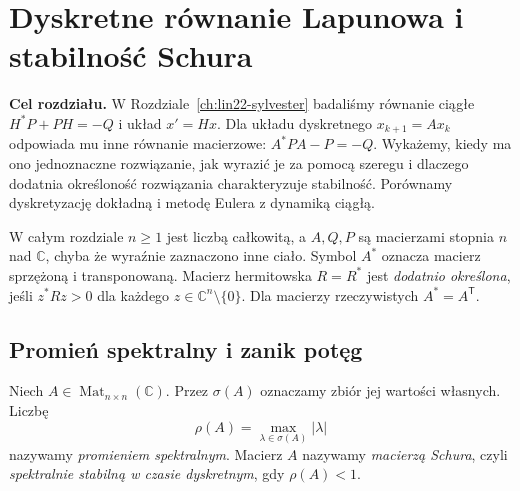 \chapter{Dyskretne równanie Lapunowa i stabilność Schura}
\label{ch:lin23-discrete-lyapunov}

\noindent\textbf{Cel rozdziału.}
W Rozdziale~\ref{ch:lin22-sylvester}
badaliśmy równanie ciągłe
\(H^*P+PH=-Q\) i układ \(x'=Hx\).
Dla układu dyskretnego
\(x_{k+1}=Ax_k\) odpowiada mu
inne równanie macierzowe:
\(A^*PA-P=-Q\).
Wykażemy, kiedy ma ono
jednoznaczne rozwiązanie,
jak wyrazić je za pomocą szeregu
i dlaczego dodatnia określoność
rozwiązania charakteryzuje stabilność.
Porównamy dyskretyzację dokładną
i metodę Eulera z dynamiką ciągłą.

W całym rozdziale
\(n\ge1\) jest liczbą całkowitą,
a \(A,Q,P\) są macierzami stopnia \(n\)
nad \(\mathbb C\), chyba że
wyraźnie zaznaczono inne ciało.
Symbol \(A^*\) oznacza
macierz sprzężoną i transponowaną.
Macierz hermitowska \(R=R^*\)
jest \emph{dodatnio określona}, jeśli
\(z^*Rz>0\) dla każdego
\(z\in\mathbb C^n\setminus\{0\}\).
Dla macierzy rzeczywistych
\(A^*=A^{\mathsf T}\).

\section{Promień spektralny i zanik potęg}
\label{sec:lin23-schur}

\begin{definicja}
\label{def:lin23-schur}
Niech \(A\in\operatorname{Mat}_{n\times n}(\mathbb C)\).
Przez \(\sigma(A)\) oznaczamy
zbiór jej wartości własnych.
Liczbę
\[
 \rho(A)=\max_{\lambda\in\sigma(A)}|\lambda|
\]
nazywamy \emph{promieniem spektralnym}.
Macierz \(A\) nazywamy
\emph{macierzą Schura},
czyli \emph{spektralnie stabilną
w czasie dyskretnym}, gdy
\(\rho(A)<1\).
\end{definicja}

